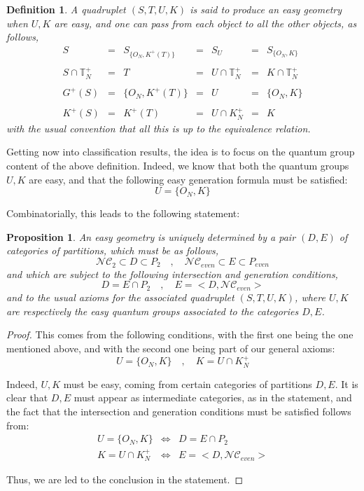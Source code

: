 \documentclass[12pt]{amsbook}
\newtheorem{definition}[theorem]{Definition}
\newtheorem{proposition}[theorem]{Proposition}
\begin{document}
\begin{definition}
A quadruplet $(S,T,U,K)$ is said to produce an easy geometry when $U,K$ are easy, and one can pass from each object to all the other objects, as follows,
$$\begin{matrix}
S&=&S_{\{O_N,K^+(T)\}}&=&S_U&=&S_{\{O_N,K\}}\\
\\
S\cap\mathbb T_N^+&=&T&=&U\cap\mathbb T_N^+&=&K\cap\mathbb T_N^+\\
\\
G^+(S)&=&\{O_N,K^+(T)\}&=&U&=&\{O_N,K\}\\
\\
K^+(S)&=&K^+(T)&=&U\cap K_N^+&=&K
\end{matrix}$$
with the usual convention that all this is up to the equivalence relation.
\end{definition}

Getting now into classification results, the idea is to focus on the quantum group content of the above definition. Indeed, we know that both the quantum groups $U,K$ are easy, and that the following easy generation formula must be satisfied:
$$U=\{O_N,K\}$$

Combinatorially, this leads to the following statement:


\begin{proposition}
An easy geometry is uniquely determined by a pair $(D,E)$ of categories of partitions, which must be as follows,
$$\mathcal{NC}_2\subset D\subset P_2\quad,\quad 
\mathcal{NC}_{even}\subset E\subset P_{even}$$
and which are subject to the following intersection and generation conditions,
$$D=E\cap P_2\quad,\quad 
E=<D,\mathcal{NC}_{even}>$$
and to the usual axioms for the associated quadruplet $(S,T,U,K)$, where $U,K$ are respectively the easy quantum groups associated to the categories $D,E$.
\end{proposition}

\begin{proof}
This comes from the following conditions, with the first one being the one mentioned above, and with the second one being part of our general axioms: 
$$U=\{O_N,K\}\quad,\quad 
K=U\cap K_N^+$$

Indeed, $U,K$ must be easy, coming from certain categories of partitions $D,E$. It is clear that $D,E$ must appear as intermediate categories, as in the statement, and the fact that the intersection and generation conditions must be satisfied follows from:
\begin{eqnarray*}
U=\{O_N,K\}&\iff&D=E\cap P_2\\
K=U\cap K_N^+&\iff&E=<D,\mathcal{NC}_{even}>
\end{eqnarray*}

Thus, we are led to the conclusion in the statement.
\end{proof}
\end{document}
